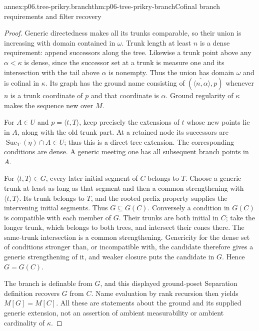 \begin{annexitem}{annex:p06.tree-prikry.branch}{thm:p06-tree-prikry-branch}{Cofinal branch requirements and filter recovery}
\begin{proof}
Generic directedness makes all its trunks comparable, so their union
is increasing with domain contained in \(\omega\). Trunk length at
least \(n\) is a dense requirement: append successors along the tree.
Likewise a trunk point above any \(\alpha<\kappa\) is dense, since
the successor set at a trunk is measure one and its intersection with
the tail above \(\alpha\) is nonempty. Thus the union has domain
\(\omega\) and is cofinal in \(\kappa\). Its graph has the ground
name consisting of \((\check{\langle n,\alpha\rangle},p)\) whenever
\(n\) is a trunk coordinate of \(p\) and that coordinate is \(\alpha\).
Ground regularity of \(\kappa\) makes the sequence new over \(M\).

For \(A\in U\) and \(p=\langle t,T\rangle\), keep precisely
the extensions of \(t\) whose new points lie in \(A\), along with
the old trunk part. At a retained node its successors are
\(\operatorname{Suc}_T(\eta)\cap A\in U\); thus this is a direct
tree extension. The corresponding conditions are dense. A generic
meeting one has all subsequent branch points in \(A\).

For \(\langle t,T\rangle\in G\), every later initial segment of
\(C\) belongs to \(T\). Choose a generic trunk at least as long as
that segment and then a common strengthening with \(\langle t,T\rangle\).
Its trunk belongs to \(T\), and the rooted prefix property supplies
the intervening initial segments. Thus \(G\subseteq G(C)\).
Conversely a condition in \(G(C)\) is compatible with each member
of \(G\). Their trunks are both initial in \(C\); take the longer
trunk, which belongs to both trees, and intersect their cones there.
The same-trunk intersection is a common strengthening. Genericity
for the dense set of conditions stronger than, or incompatible with,
the candidate therefore gives a generic strengthening of it, and
weaker closure puts the candidate in \(G\). Hence \(G=G(C)\).

The branch is definable from \(G\), and this displayed ground-poset
Separation definition recovers \(G\) from \(C\). Name evaluation by
rank recursion then yields \(M[G]=M[C]\). All these are statements
about the ground and its supplied generic extension, not an assertion
of ambient measurability or ambient cardinality of \(\kappa\).
\end{proof}
\end{annexitem}


